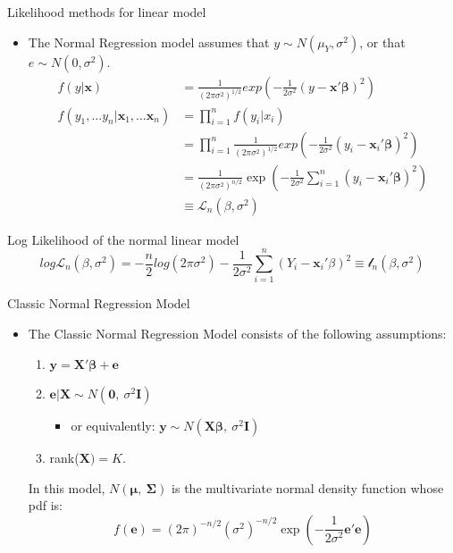 \documentclass[aspectratio=169, handout, t]{beamer}
\numberwithin{equation}{section}
\begin{document}
\begin{frame}{Likelihood methods for linear model}
\begin{itemize}
\item The Normal Regression model assumes that $y\sim N(\mu_Y, \sigma^2)$, or that $e\sim N(0, \sigma^2)$.
\begin{align*}
f(y|\bm{x})&=\frac{1}{(2\pi \sigma^2)^{1/2}}exp\left(-\frac{1}{2\sigma^2}(y-\bm{x}'\bm{\beta})^2\right)\\
f(y_1,\ldots y_n|\bm{x}_1,\ldots \bm{x}_n)&=\prod_{i=1}^n f(y_i|x_i)\\
&=\prod_{i=1}^n\frac{1}{(2\pi \sigma^2)^{1/2}}exp\left(-\frac{1}{2\sigma^2}(y_i-\bm{x}_i'\bm{\beta})^2\right)\\
&=\frac{1}{(2\pi \sigma^2)^{n/2}}\exp\left(-\frac{1}{2\sigma^2}\sum_{i=1}^n(y_i-\bm{x}_i'\bm{\beta})^2\right)\\
&\equiv \mathcal{L}_n(\beta, \sigma^2)
\end{align*}
\end{itemize}
\end{frame}

\begin{frame}{Log Likelihood of the normal linear model}
$$log \mathcal{L}_n(\beta, \sigma^2) = -\frac{n}{2}log(2\pi \sigma^2)-\frac{1}{2\sigma^2}\sum_{i=1}^n (Y_i-\bm{x}_i'\beta)^2\equiv \mathcal{l}_n(\beta,\sigma^2)$$
\end{frame}



\begin{frame}{Classic Normal Regression Model}
\begin{itemize}
\item The Classic Normal Regression Model consists of the following assumptions:
\begin{enumerate}
\item $\bm{y}=\bm{X'\beta}+\bm{e}$
\item $\bm{e}|\bm{X} \sim N(\bm{0},\ \sigma^2\bm{I})$
\begin{itemize}
\item or equivalently: $\bm{y}\sim N(\bm{X\beta},\ \sigma^2\bm{I})$
\end{itemize}
\item rank($\bm{X})=K$.
\end{enumerate}
In this model, $N(\bm{\mu},\ \bm{\Sigma})$ is the multivariate normal density function whose pdf is:
$$f(\bm{e})=(2\pi)^{-n/2}(\sigma^2)^{-n/2}\exp(-\frac{1}{2\sigma^2}\bm{e}'\bm{e})$$
\end{itemize}
\end{frame}
\end{document}
